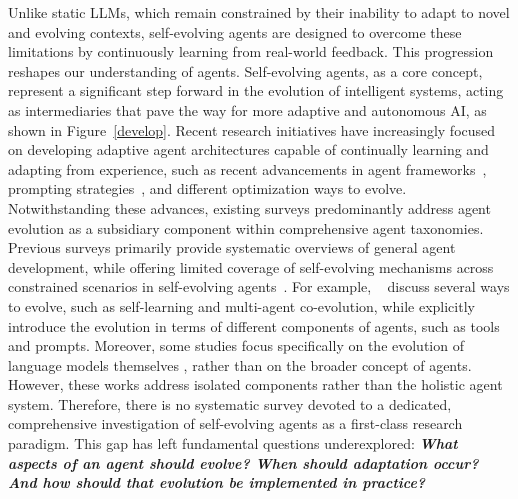 Unlike static LLMs, which remain constrained by their inability to adapt to novel and evolving contexts, self-evolving agents are designed to overcome these limitations by continuously learning from real-world feedback.
This progression reshapes our understanding of agents. 
Self-evolving agents, as a core concept, represent a significant step forward in the evolution of intelligent systems, acting as intermediaries that pave the way for more adaptive and autonomous AI, as shown in Figure~\ref{develop}.
Recent research initiatives have increasingly focused on developing adaptive agent architectures capable of continually learning and adapting from experience, such as recent advancements in agent frameworks~\citep{yin2025godelagentselfreferentialagent}, prompting strategies~\citep{fernando2023promptbreeder}, and different optimization ways to evolve. Notwithstanding these advances, existing surveys predominantly address agent evolution as a subsidiary component within comprehensive agent taxonomies. Previous surveys primarily provide systematic overviews of general agent development, while offering limited coverage of self-evolving mechanisms across constrained scenarios in self-evolving agents~\citep {luo2025largelanguagemodelagent, liu2025advanceschallengesfoundationagents}. For example, ~\cite{luo2025largelanguagemodelagent} discuss several ways to evolve, such as self-learning and multi-agent co-evolution, while \cite{liu2025advanceschallengesfoundationagents} explicitly introduce the evolution in terms of different components of agents, such as tools and prompts. Moreover, some studies focus specifically on the evolution of language models themselves \citep{tao2024survey-self-evo-llm}, rather than on the broader concept of agents. However, these works address isolated components rather than the holistic agent system. Therefore, there is no systematic survey devoted
to a dedicated, comprehensive investigation of self-evolving agents as a first-class research paradigm. This
gap has left fundamental questions underexplored: \textbf{\textit{What aspects of an agent should evolve? When should adaptation occur? And how should that evolution be implemented in practice?}}


